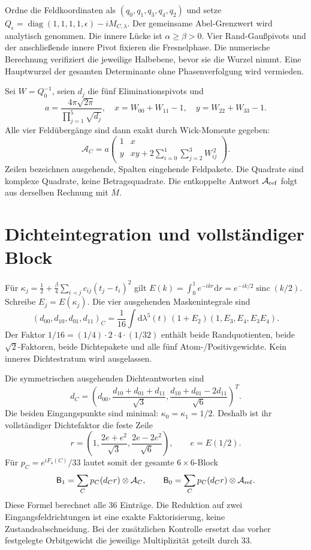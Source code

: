 \documentclass[10pt,a4paper]{article}
\newcommand{\dd}{\mathrm d}\newcommand{\one}{\mathbf1}\newcommand{\D}{\mathcal D}
\newcommand{\A}{\mathcal A}\newcommand{\B}{\mathsf B}
\begin{document}
Ordne die Feldkoordinaten als $(q_0,q_1,q_3,q_4,q_2)$ und setze
$Q_\epsilon=\operatorname{diag}(1,1,1,1,\epsilon)-iM_{C,\lambda}$.
Der gemeinsame Abel-Grenzwert wird analytisch genommen.
Die innere Lücke ist $\alpha\geq\beta>0$. Vier Rand-Gaußpivots und der
anschließende innere Pivot fixieren die Fresnelphase. Die numerische
Berechnung verifiziert die jeweilige Halbebene, bevor sie die Wurzel nimmt.
Eine Hauptwurzel der gesamten Determinante ohne Phasenverfolgung wird vermieden.

Sei $W=Q_0^{-1}$, seien $d_j$ die fünf Eliminationspivots und
\[
 a=\frac{4\pi\sqrt{2\pi}}{\prod_{j=1}^5\sqrt{d_j}},\quad
 x=W_{00}+W_{11}-1,\quad y=W_{22}+W_{33}-1.
\]
Alle vier Feldübergänge sind dann exakt durch Wick-Momente gegeben:
\[
 \A_C=a\begin{pmatrix}
 1&x\\y&xy+2\sum_{i=0}^1\sum_{j=2}^3W_{ij}^{\,2}
 \end{pmatrix}.
\]
Zeilen bezeichnen ausgehende, Spalten eingehende Feldpakete. Die Quadrate
sind komplexe Quadrate, keine Betragsquadrate. Die entkoppelte Antwort
$\A_{\rm ref}$ folgt aus derselben Rechnung mit $\overline M$.

\section{Dichteintegration und vollständiger Block}
Für $\kappa_j=\tfrac12+\tfrac\beta4\sum_{i\prec j}c_{ij}(t_j-t_i)^2$ gilt
$E(k)=\int_0^1e^{-ikr}\dd r=e^{-ik/2}\operatorname{sinc}(k/2)$.
Schreibe $E_j=E(\kappa_j)$. Die vier ausgehenden Maskenintegrale sind
\[
 (d_{00},d_{10},d_{01},d_{11})_C=
 \frac1{16}\int\dd\lambda^5(t)\,(1+E_2)(1,E_3,E_4,E_3E_4).
\]
Der Faktor $1/16=(1/4)\cdot2\cdot4\cdot(1/32)$ enthält beide
Randquotienten, beide $\sqrt2$-Faktoren, beide Dichtepakete und alle fünf
Atom-/Positivgewichte. Kein inneres Dichtestratum wird ausgelassen.

\newpage
Die symmetrischen ausgehenden Dichteantworten sind
\[
 d_C=\left(d_{00},\frac{d_{10}+d_{01}+d_{11}}{\sqrt3},
                    \frac{d_{10}+d_{01}-2d_{11}}{\sqrt6}\right)^T.
\]
Die beiden Eingangspunkte sind minimal: $\kappa_0=\kappa_1=1/2$.
Deshalb ist ihr vollständiger Dichtefaktor die feste Zeile
\[
 r=\left(1,\frac{2e+e^2}{\sqrt3},\frac{2e-2e^2}{\sqrt6}\right),
 \qquad e=E(1/2).
\]
Für $p_C=e^{iF_4(C)}/33$ lautet somit der gesamte $6\times6$-Block
\[
 \B_1=\sum_Cp_C(d_Cr)\otimes\A_C,\qquad
 \B_0=\sum_Cp_C(d_Cr)\otimes\A_{\rm ref}.
\]
Diese Formel berechnet alle 36 Einträge. Die Reduktion auf zwei
Eingangsfeldrichtungen ist eine exakte Faktorisierung, keine
Zustandsabschneidung. Bei der zusätzlichen Kontrolle ersetzt das vorher
festgelegte Orbitgewicht die jeweilige Multiplizität geteilt durch 33.
\end{document}
